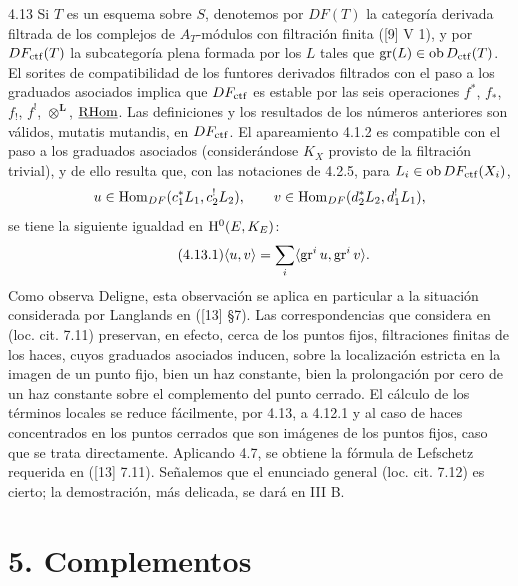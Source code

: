 \begin{statement}{4.13}
Si $T$ es un esquema sobre $S$, denotemos por $DF(T)$ la categoría derivada filtrada de los complejos de $A_T$-módulos con filtración finita ([9] V 1), y por $DF_{\mathrm{ctf}}(T)$ la subcategoría plena formada por los $L$ tales que $\operatorname{gr}(L)\in\operatorname{ob}D_{\mathrm{ctf}}(T)$. El sorites de compatibilidad de los funtores derivados filtrados con el paso a los graduados asociados implica que $DF_{\mathrm{ctf}}$ es estable por las seis operaciones $f^*$, $f_*$, $f_!$, $f^!$, $\otimes^{\mathbf L}$, $\underline{\mathrm{RHom}}$. Las definiciones y los resultados de los números anteriores son válidos, mutatis mutandis, en $DF_{\mathrm{ctf}}$. El apareamiento 4.1.2 es compatible con el paso a los graduados asociados (considerándose $K_X$ provisto de la filtración trivial), y de ello resulta que, con las notaciones de 4.2.5, para $L_i\in\operatorname{ob} DF_{\mathrm{ctf}}(X_i)$,
\[
u\in\operatorname{Hom}_{DF}(c_1^*L_1,c_2^!L_2),\qquad
v\in\operatorname{Hom}_{DF}(d_2^*L_2,d_1^!L_1),
\]
se tiene la siguiente igualdad en $\mathrm{H}^0(E,K_E)$:
\begin{equation}
\tag{4.13.1}
\langle u,v\rangle=\sum_i\langle \operatorname{gr}^i u,\operatorname{gr}^i v\rangle.
\end{equation}
Como observa Deligne, esta observación se aplica en particular a la situación considerada por Langlands en ([13] §7). Las correspondencias que considera en (loc. cit. 7.11) preservan, en efecto, cerca de los puntos fijos, filtraciones finitas de los haces, cuyos graduados asociados inducen, sobre la localización estricta en la imagen de un punto fijo, bien un haz constante, bien la prolongación por cero de un haz constante sobre el complemento del punto cerrado. El cálculo de los términos locales se reduce fácilmente, por 4.13, a 4.12.1 y al caso de haces concentrados en los puntos cerrados que son imágenes de los puntos fijos, caso que se trata directamente. Aplicando 4.7, se obtiene la fórmula de Lefschetz requerida en ([13] 7.11). Señalemos que el enunciado general (loc. cit. 7.12) es cierto; la demostración, más delicada, se dará en III B.
\end{statement}



\section*{5. Complementos}
